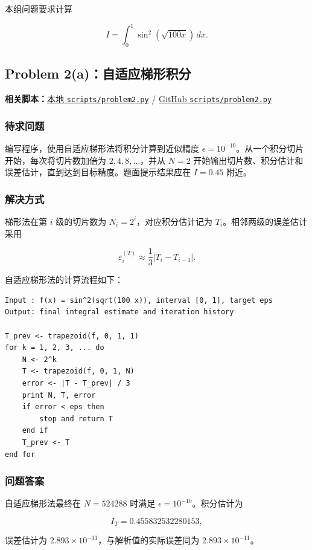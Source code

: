 \documentclass[12pt,a4paper,fontset=none]{ctexart}
\newcommand{\fileinline}[1]{{\urlstyle{same}\nolinkurl{#1}}}
\newcommand{\metadataline}[1]{#1}
\newcommand{\scriptpath}[1]{\fileinline{#1}}
\newcommand{\githubscriptsbase}{https://github.com/Void0312Aurora/computational-physics-homework-2026/blob/main/07/scripts}
\newcommand{\scriptlink}[1]{\noindent\metadataline{\textbf{相关脚本：}\href{../../../scripts/#1}{本地 \scriptpath{scripts/#1}} / \href{\githubscriptsbase/#1}{GitHub \scriptpath{scripts/#1}}}\par\medskip}
\begin{document}
本组问题要求计算

\[
I=\int_0^1\sin^2(\sqrt{100x})\,dx.
\]

\subsection{Problem 2(a)：自适应梯形积分}\label{problem-2a}

\scriptlink{problem2.py}

\subsubsection{待求问题}\label{ux5f85ux6c42ux95eeux9898-2}

编写程序，使用自适应梯形法将积分计算到近似精度 \(\epsilon=10^{-10}\)。从一个积分切片开始，每次将切片数加倍为 \(2,4,8,\ldots\)，并从 \(N=2\) 开始输出切片数、积分估计和误差估计，直到达到目标精度。题面提示结果应在 \(I=0.45\) 附近。

\subsubsection{解决方式}\label{ux89e3ux51b3ux65b9ux5f0f-2}

梯形法在第 \(i\) 级的切片数为 \(N_i=2^i\)，对应积分估计记为 \(T_i\)。相邻两级的误差估计采用

\[
\varepsilon_i^{(T)}\approx \frac{1}{3}|T_i-T_{i-1}|.
\]

自适应梯形法的计算流程如下：

\begin{verbatim}
Input : f(x) = sin^2(sqrt(100 x)), interval [0, 1], target eps
Output: final integral estimate and iteration history

T_prev <- trapezoid(f, 0, 1, 1)
for k = 1, 2, 3, ... do
    N <- 2^k
    T <- trapezoid(f, 0, 1, N)
    error <- |T - T_prev| / 3
    print N, T, error
    if error < eps then
        stop and return T
    end if
    T_prev <- T
end for
\end{verbatim}

\subsubsection{问题答案}\label{ux95eeux9898ux7b54ux6848-2}

自适应梯形法最终在 \(N=524288\) 时满足 \(\epsilon=10^{-10}\)。积分估计为

\[
I_T=0.455832532280153,
\]

误差估计为 \(2.893\times10^{-11}\)，与解析值的实际误差同为 \(2.893\times10^{-11}\)。
\end{document}

